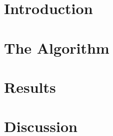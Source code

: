 
\mainmatter


\chapter{Introduction}

\FloatBarrier

\chapter{The Algorithm}


\FloatBarrier

\chapter{Results}

\FloatBarrier


\chapter{Discussion}

\FloatBarrier
